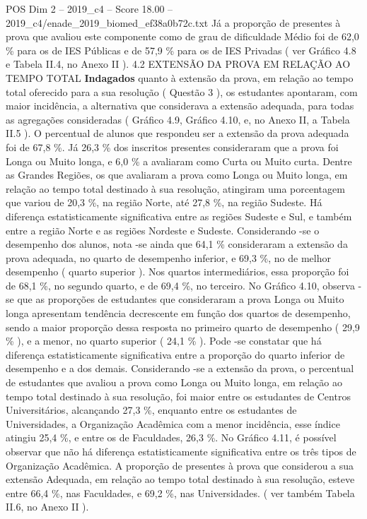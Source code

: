 \begin{textsample}{POS Dim 2 – 2019\_c4 – Score 18.00 – 2019\_c4/enade\_2019\_biomed\_ef38a0b72c.txt}
Já a proporção de presentes à prova que avaliou este componente como de grau de dificuldade Médio foi de 62,0 \% para os de IES Públicas e de 57,9 \% para os de IES Privadas ( ver Gráfico 4.8 e Tabela II.4, no Anexo II ). 4.2 EXTENSÃO DA PROVA EM RELAÇÃO AO TEMPO TOTAL \textbf{Indagados} quanto à extensão da prova, em relação ao tempo total oferecido para a sua resolução ( Questão 3 ), os estudantes apontaram, com maior incidência, a alternativa que considerava a extensão adequada, para todas as agregações consideradas ( Gráfico 4.9, Gráfico 4.10, e, no Anexo II, a Tabela II.5 ).
O percentual de alunos que respondeu ser a extensão da prova adequada foi de 67,8 \%.
Já 26,3 \% dos inscritos presentes consideraram que a prova foi Longa ou Muito longa, e 6,0 \% a avaliaram como Curta ou Muito curta.
Dentre as Grandes Regiões, os que avaliaram a prova como Longa ou Muito longa, em relação ao tempo total destinado à sua resolução, atingiram uma porcentagem que variou de 20,3 \%, na região Norte, até 27,8 \%, na região Sudeste.
Há diferença estatisticamente significativa entre as regiões Sudeste e Sul, e também entre a região Norte e as regiões Nordeste e Sudeste.
Considerando -se o desempenho dos alunos, nota -se ainda que 64,1 \% consideraram a extensão da prova adequada, no quarto de desempenho inferior, e 69,3 \%, no de melhor desempenho ( quarto superior ).
Nos quartos intermediários, essa proporção foi de 68,1 \%, no segundo quarto, e de 69,4 \%, no terceiro.
No Gráfico 4.10, observa -se que as proporções de estudantes que consideraram a prova Longa ou Muito longa apresentam tendência decrescente em função dos quartos de desempenho, sendo a maior proporção dessa resposta no primeiro quarto de desempenho ( 29,9 \% ), e a menor, no quarto superior ( 24,1 \% ).
Pode -se constatar que há diferença estatisticamente significativa entre a proporção do quarto inferior de desempenho e a dos demais.
Considerando -se a extensão da prova, o percentual de estudantes que avaliou a prova como Longa ou Muito longa, em relação ao tempo total destinado à sua resolução, foi maior entre os estudantes de Centros Universitários, alcançando 27,3 \%, enquanto entre os estudantes de Universidades, a Organização Acadêmica com a menor incidência, esse índice atingiu 25,4 \%, e entre os de Faculdades, 26,3 \%.
No Gráfico 4.11, é possível observar que não há diferença estatisticamente significativa entre os três tipos de Organização Acadêmica.
A proporção de presentes à prova que considerou a sua extensão Adequada, em relação ao tempo total destinado à sua resolução, esteve entre 66,4 \%, nas Faculdades, e 69,2 \%, nas Universidades. ( ver também Tabela II.6, no Anexo II ).

\end{textsample}

